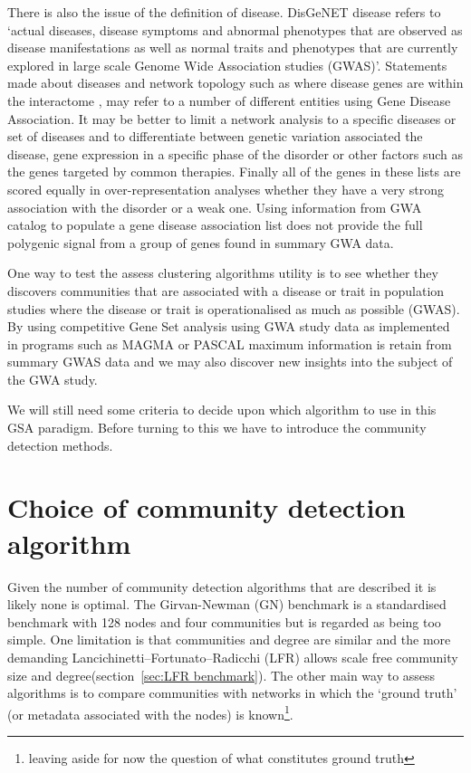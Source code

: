 There is also the issue of the definition of disease.  DisGeNET disease refers to `actual diseases, disease symptoms and abnormal phenotypes that are observed as disease manifestations as well as normal traits and phenotypes that are currently explored in large scale Genome Wide Association studies (GWAS)\cite{pinero2020disgenet}'. Statements made about diseases and network topology such as where disease genes are within the interactome \cite{barabasi2016network},\cite{ghiassian2015disease} may refer to a number of different entities using Gene Disease Association. It may be better to limit a network analysis to a specific diseases or set of diseases and to differentiate between genetic variation associated the disease, gene expression in a specific phase of the disorder or other factors such as the genes targeted by common therapies. Finally all of the genes in these lists are scored equally in over-representation analyses whether they have a very strong association with the disorder or a weak one. Using information from GWA catalog to populate a gene disease association list does not provide the full polygenic signal from a group of genes found in summary GWA data. 

One way to test the assess clustering algorithms utility is to see whether they discovers communities that are associated with a disease or trait in population studies where the disease or trait is operationalised as much as possible (GWAS)\cite{cai2020reviewing}\cite{van2013power}. By using competitive Gene Set analysis using GWA study data as implemented in programs such as MAGMA\cite{de2015magma} or PASCAL\cite{lamparter2016fast} maximum information is retain from summary GWAS data and we  may also discover new insights into the subject of the GWA study.

We will still need some criteria to decide upon which algorithm to use in this GSA paradigm. Before turning to this we have to introduce the community detection methods. 





\section{Choice of community detection algorithm}
\label{sec:choice of community detection algorithm}
Given the number of community detection algorithms that are described it is likely none is optimal\cite{aldecoa2013exploring}. The Girvan-Newman (GN) benchmark \cite{girvan2002community} is a standardised benchmark with 128 nodes and four communities but is regarded as being too simple\cite{aldecoa2013exploring}. One limitation is that communities and degree are similar and the more demanding Lancichinetti–Fortunato–Radicchi (LFR)\cite{lancichinetti2008benchmark} allows scale free community size and degree(section~\ref{sec:LFR benchmark}). The other main way to assess algorithms is to compare communities with networks in which the `ground truth' (or metadata associated with the nodes) is known\footnote{leaving aside for now the question of what constitutes ground truth}\cite{leskovec2010empirical}.

